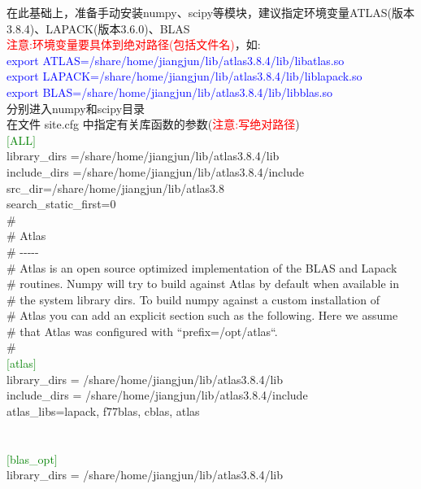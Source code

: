 \documentclass[10pt,a4paper]{article}
\begin{document}
在此基础上，准备手动安装\textrm{numpy}、\textrm{scipy}等模块，建议指定环境变量\textrm{ATLAS}(版本3.8.4)、\textrm{LAPACK}(版本3.6.0)、\textrm{BLAS}\\ 
\textcolor{red}{注意:环境变量要具体到绝对路径(包括文件名)}，如:\\
\textcolor{blue}{export ATLAS=/share/home/jiangjun/lib/atlas3.8.4/lib/libatlas.so}\\
\textcolor{blue}{export LAPACK=/share/home/jiangjun/lib/atlas3.8.4/lib/liblapack.so}\\
\textcolor{blue}{export BLAS=/share/home/jiangjun/lib/atlas3.8.4/lib/libblas.so}\\
分别进入\textrm{numpy}和\textrm{scipy}目录\\ 
在文件 site.cfg 中指定有关库函数的参数(\textcolor{red}{注意:写绝对路径})\\
\textcolor{green}{$[$ALL$]$}\\
library\_dirs =/share/home/jiangjun/lib/atlas3.8.4/lib \\
include\_dirs =/share/home/jiangjun/lib/atlas3.8.4/include \\
src\_dir=/share/home/jiangjun/lib/atlas3.8 \\
search\_static\_first=0 \\
\#
\\
\# Atlas\\
\# -\/-\/-\/-\/-\\
\# Atlas is an open source optimized implementation of the BLAS and Lapack\\
\# routines. Numpy will try to build against Atlas by default when available in\\
\# the system library dirs. To build numpy against a custom installation of\\
\# Atlas you can add an explicit section such as the following. Here we assume\\
\# that Atlas was configured with ``prefix=/opt/atlas``.\\
\#\\
\textcolor{green}{$[$atlas$]$}\\
library\_dirs = /share/home/jiangjun/lib/atlas3.8.4/lib \\
include\_dirs = /share/home/jiangjun/lib/atlas3.8.4/include \\
atlas\_libs=lapack, f77blas, cblas, atlas \\
\\
\\
\textcolor{green}{$[$blas\_opt$]$}\\
library\_dirs = /share/home/jiangjun/lib/atlas3.8.4/lib \\
\end{document}
